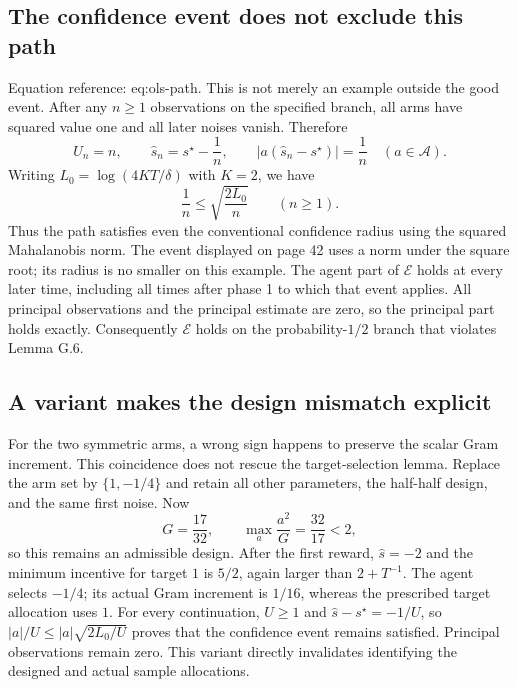 \documentclass[10pt]{article}
\begin{document}
\subsection*{The confidence event does not exclude this path}
Equation reference: eq:ols-path. This is not merely an example outside the good event. After any \(n\geq1\) observations on the specified branch, all arms have squared value one and all later noises vanish. Therefore \[
 U_n=n,\qquad
 \widehat s_n=s^\star-\frac1n,\qquad
 |a(\widehat s_n-s^\star)|=\frac1n
 \quad(a\in\mathcal A).\] Writing \(L_0=\log(4KT/\delta)\) with \(K=2\), we have \[\frac1n \leq \sqrt{\frac{2L_0}{n}}\qquad(n\geq1).\] Thus the path satisfies even the conventional confidence radius using the squared Mahalanobis norm. The event displayed on page 42 uses a norm under the square root; its radius is no smaller on this example. The agent part of \(\mathcal E\) holds at every later time, including all times after phase 1 to which that event applies. All principal observations and the principal estimate are zero, so the principal part holds exactly. Consequently \(\mathcal E\) holds on the probability-\(1/2\) branch that violates Lemma G.6.\par
\subsection*{A variant makes the design mismatch explicit}
For the two symmetric arms, a wrong sign happens to preserve the scalar Gram increment. This coincidence does not rescue the target-selection lemma. Replace the arm set by \(\{1,-1/4\}\) and retain all other parameters, the half-half design, and the same first noise. Now \[G=\frac{17}{32},\qquad
 \max_a\frac{a^2}{G}=\frac{32}{17}<2,\] so this remains an admissible design. After the first reward, \(\widehat s=-2\) and the minimum incentive for target \(1\) is \(5/2\), again larger than \(2+T^{-1}\). The agent selects \(-1/4\); its actual Gram increment is \(1/16\), whereas the prescribed target allocation uses \(1\). For every continuation, \(U\geq1\) and \(\widehat s-s^\star=-1/U\), so \(|a|/U\leq |a|\sqrt{2L_0/U}\) proves that the confidence event remains satisfied. Principal observations remain zero. This variant directly invalidates identifying the designed and actual sample allocations.\par
\end{document}
